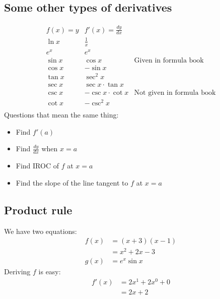 \documentclass[12pt, letterpaper]{article}
\begin{document}
\subsection{Some other types of derivatives}
$$\begin{array}{r|ll}
    f(x)=y & f'(x)=\frac{dy}{dx} \\ \hline
    \ln x & \frac{1}{x}\\
    e^x & e^x\\
    \sin x & \cos x & \text{Given in formula book} \\
    \cos x & -\sin x \\
    \tan x & \sec^2 x \\ \hline
    \sec x & \sec x \cdot \tan x \\
    \csc x & - \csc x \cdot \cot x & \text{Not given in formula book}\\
    \cot x & -\csc^2 x \\
\end{array}$$
Questions that mean the same thing:
\begin{itemize}
    \item Find $f'(a)$
    \item Find $\frac{dy}{dx}$ when $x=a$
    \item Find IROC of $f$ at $x=a$
    \item Find the slope of the line tangent to $f$ at $x=a$
\end{itemize}

\subsection{Product rule}
We have two equations:
\begin{align*}
    f(x) &= (x+3)(x-1) \\
    &= x^2+2x-3 \\
    g(x) &= e^x\sin x
\end{align*}
Deriving $f$ is easy:
\begin{align*}
    f'(x) &=2x^1+2x^0+0 \\
    &=2x+2
\end{align*}
\end{document}
